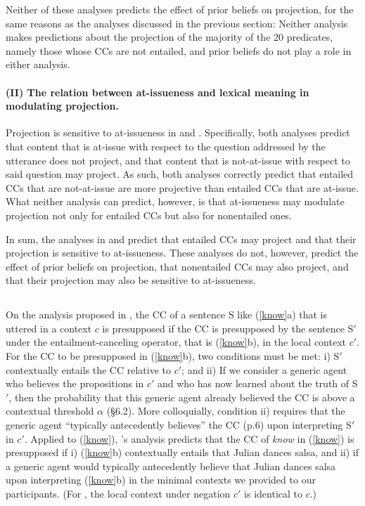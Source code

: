 \documentclass[11pt,fleqn]{article}
\newcommand{\6}{\mbox{$[\hspace*{-.6mm}[$}}
\newcommand{\9}{\mbox{$]\hspace*{-.6mm}]$}}
\newcommand{\citepos}[1]{\citeauthor{#1}'s \citeyear{#1}}
\begin{document}
Neither of these analyses predicts the effect of prior beliefs on projection, for the same reasons as the analyses discussed in the previous section: Neither analysis makes predictions about the projection of the majority of the 20 predicates, namely those whose CCs are not entailed, and prior beliefs do not play a role in either analysis.

\paragraph{(II) The relation between at-issueness and lexical meaning in modulating projection.}

Projection is sensitive to at-issueness in \citealt{abrusan2011,abrusan2016} and \citealt{best-question}. Specifically, both analyses predict that content that is at-issue with respect to the question addressed by the utterance does not project, and that content that is not-at-issue with respect to said question may project. As such, both analyses correctly predict that entailed CCs that are not-at-issue are more projective than entailed CCs that are at-issue. What neither analysis can predict, however, is that at-issueness may modulate projection not only for entailed CCs but also for nonentailed ones. 

\bigskip

In sum, the analyses in \citealt{abrusan2011,abrusan2016} and \citealt{best-question} predict that entailed CCs may project and that their projection is sensitive to at-issueness.  These analyses do not, however, predict the effect of prior beliefs on projection, that nonentailed CCs may also project, and that their projection may also be sensitive to at-issueness.

\subsection{\citealt{schlenker2021}}

On the analysis proposed in \citealt{schlenker2021}, the CC of a sentence S like (\ref{know}a) that is uttered in a context $c$ is presupposed if the CC is presupposed by the sentence S$'$under the entailment-canceling operator, that is (\ref{know}b), in the local context $c'$. For the CC to be presupposed in (\ref{know}b), two conditions must be met: i) S$'$ contextually entails the CC relative to $c'$; and ii) If we consider a generic agent who believes the propositions in $c'$ and who has now learned about the truth of S$'$, then the probability that this generic agent already believed the CC is above a contextual threshold $\alpha$ (\S6.2). More colloquially, condition ii) requires that the generic agent ``typically antecedently believes'' the CC (p.6) upon interpreting S$'$ in $c'$. Applied to (\ref{know}), \citepos{schlenker2021} analysis predicts that the CC of \emph{know} in (\ref{know})  is presupposed if i) (\ref{know}b) contextually entails that Julian dances salsa, and ii) if a generic agent would typically antecedently believe that Julian dances salsa upon interpreting (\ref{know}b) in the minimal contexts we provided to our participants. (For \citealt{schlenker2021}, the local context under negation $c'$ is identical to $c$.)
\end{document}
